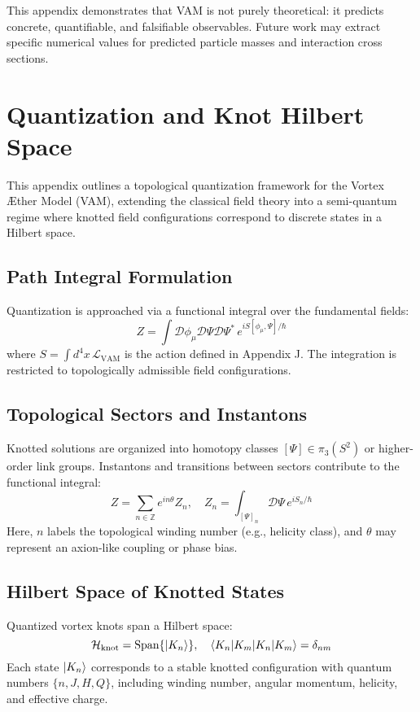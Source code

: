 This appendix demonstrates that VAM is not purely theoretical: it predicts concrete, quantifiable, and falsifiable observables. Future work may extract specific numerical values for predicted particle masses and interaction cross sections.

\section{Quantization and Knot Hilbert Space}
This appendix outlines a topological quantization framework for the Vortex Æther Model (VAM), extending the classical field theory into a semi-quantum regime where knotted field configurations correspond to discrete states in a Hilbert space.

\subsection{Path Integral Formulation}
Quantization is approached via a functional integral over the fundamental fields:
\begin{equation}
    Z = \int \mathcal{D}\phi_\mu \mathcal{D}\Psi \mathcal{D}\Psi^* \, e^{i S[\phi_\mu, \Psi] / \hbar}
\end{equation}
where $S = \int d^4x \, \mathcal{L}_{\text{VAM}}$ is the action defined in Appendix J. The integration is restricted to topologically admissible field configurations.

\subsection{Topological Sectors and Instantons}
Knotted solutions are organized into homotopy classes $[\Psi] \in \pi_3(S^2)$ or higher-order link groups. Instantons and transitions between sectors contribute to the functional integral:
\begin{equation}
    Z = \sum_{n \in \mathbb{Z}} e^{i n \theta} Z_n, \quad Z_n = \int_{[\Psi]_n} \mathcal{D} \Psi \, e^{i S_n / \hbar}
\end{equation}
Here, $n$ labels the topological winding number (e.g., helicity class), and $\theta$ may represent an axion-like coupling or phase bias.

\subsection{Hilbert Space of Knotted States}
Quantized vortex knots span a Hilbert space:
\begin{equation}
    \mathcal{H}_{\text{knot}} = \text{Span} \{ \ket{K_n} \}, \quad \braket{K_n | K_m} = \delta_{nm}
\end{equation}
Each state $\ket{K_n}$ corresponds to a stable knotted configuration with quantum numbers $\{ n, J, H, Q \}$, including winding number, angular momentum, helicity, and effective charge.

